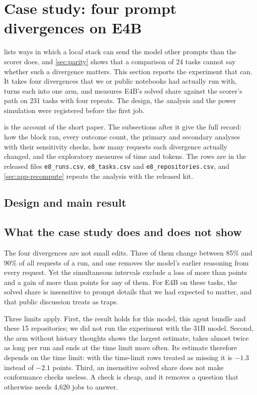 \section{Case study: four prompt divergences on E4B}\label{sec:case}

 lists ways in which a local stack can send the model other prompts than the scorer does, and
\cref{sec:parity} shows that a comparison of 24 tasks cannot say whether such a divergence matters. This section
reports the experiment that can. It takes four divergences that we or public notebooks had actually run with, turns
each into one arm, and measures E4B's solved share against the scorer's path on 231 tasks with four repeats. The
design, the analysis and the power simulation were registered before the first job.

 is the account of the short paper. The subsections after it give the full record: how the
block ran, every outcome count, the primary and secondary analyses with their sensitivity checks, how many requests
each divergence actually changed, and the exploratory measures of time and tokens. The rows are in the released
files \texttt{e8\_runs.csv}, \texttt{e8\_tasks.csv} and \texttt{e8\_repositories.csv}, and \cref{sec:app-recompute}
repeats the analysis with the released kit.

\subsection{Design and main result}\label{sec:case-design}





\subsection{What the case study does and does not show}

The four divergences are not small edits. Three of them change between 85\% and 90\% of all requests of a run, and
one removes the model's earlier reasoning from every request. Yet the simultaneous intervals exclude a loss of more
than \SHSimLo{} points and a gain of more than \STSimHi{} points for any of them. For E4B on these tasks, the
solved share is insensitive to prompt details that we had expected to matter, and that public discussion treats as
traps.

Three limits apply. First, the result holds for this model, this agent bundle and these 15 repositories; we did not
run the experiment with the 31B model. Second, the arm without history thoughts shows the largest estimate, takes
almost twice as long per run and ends at the time limit more often. Its estimate therefore depends on the time
limit: with the time-limit rows treated as missing it is $-1.3$ instead of $-2.1$ points. Third, an insensitive solved
share does not make conformance checks useless. A check is cheap, and it removes a question that otherwise needs
4,620 jobs to answer.

